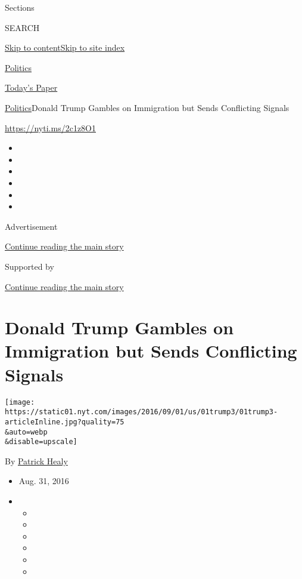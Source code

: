 Sections

SEARCH

\protect\hyperlink{site-content}{Skip to
content}\protect\hyperlink{site-index}{Skip to site index}

\href{https://www.nytimes.com/section/politics}{Politics}

\href{https://myaccount.nytimes.com/auth/login?response_type=cookie\&client_id=vi}{}

\href{https://www.nytimes.com/section/todayspaper}{Today's Paper}

\href{/section/politics}{Politics}\textbar{}Donald Trump Gambles on
Immigration but Sends Conflicting Signals

\url{https://nyti.ms/2c1z8O1}

\begin{itemize}
\item
\item
\item
\item
\item
\item
\end{itemize}

Advertisement

\protect\hyperlink{after-top}{Continue reading the main story}

Supported by

\protect\hyperlink{after-sponsor}{Continue reading the main story}

\hypertarget{donald-trump-gambles-on-immigration-but-sends-conflicting-signals}{%
\section{Donald Trump Gambles on Immigration but Sends Conflicting
Signals}\label{donald-trump-gambles-on-immigration-but-sends-conflicting-signals}}

\texttt{[image: https://static01.nyt.com/images/2016/09/01/us/01trump3/01trump3-articleInline.jpg?quality=75\\\&auto=webp\\\&disable=upscale]}

By \href{http://www.nytimes.com/by/patrick-healy}{Patrick Healy}

\begin{itemize}
\item
  Aug. 31, 2016
\item
  \begin{itemize}
  \item
  \item
  \item
  \item
  \item
  \item
  \end{itemize}
\end{itemize}

